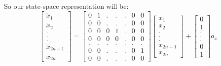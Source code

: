 \documentclass[letterpaper, 10 pt, conference]{ieeeconf}
\begin{document}
So our state-space representation will be:
\begin{equation}
\begin{bmatrix}
\dot{x}_1\\ 
\dot{x}_2\\
.\\
.\\
.\\
\dot{x}_{2n-1}\\
\dot{x}_{2n}

\end{bmatrix} = \begin{bmatrix}
0 & 1 & . & . & . & 0 & 0 \\
0 & 0 & . & . & . & 0 & 0 \\
0 & 0 & 0 & 1 & . & 0 & 0 \\
0 & 0 & 0 & 0 & . & 0 & 0 \\
. & . & . & . & . & . & . \\
0 & 0 & . & . & . & 0 & 1 \\
0 & 0 & . & . & . & 0 & 0 
\end{bmatrix}  \begin{bmatrix}
x_1\\
x_2\\
.\\
.\\
.\\
x_{2n-1}\\
x_{2n}
\end{bmatrix} + \begin{bmatrix}
0\\
1\\
.\\
.\\
.\\
0\\
1
\end{bmatrix} a_x
\end{equation}
\end{document}

